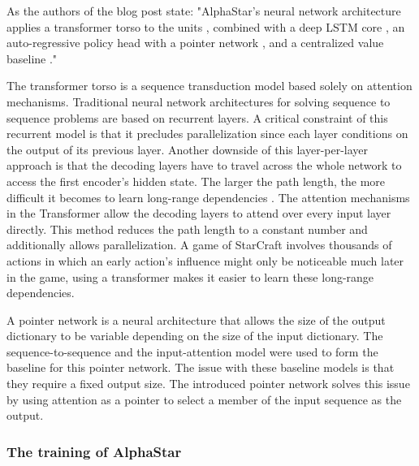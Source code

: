 As the authors of the blog post state: "AlphaStar's neural network architecture applies a transformer torso to the units \citep{vaswani2017attention}, combined with a deep LSTM core \citep{hochreiter1997long}, an auto-regressive policy head \citep{vinyals2017starcraft} with a pointer network \citep{vinyals2015pointer}, and a centralized value baseline \citep{alphastarblog}."

The transformer torso \citep{vaswani2017attention} is a sequence transduction model based solely on attention mechanisms. Traditional neural network architectures for solving sequence to sequence problems are based on recurrent layers. A critical constraint of this recurrent model is that it precludes parallelization since each layer conditions on the output of its previous layer. Another downside of this layer-per-layer approach is that the decoding layers have to travel across the whole network to access the first encoder's hidden state. The larger the path length, the more difficult it becomes to learn long-range dependencies \citep{hochreiter2001gradient}. The attention mechanisms in the Transformer allow the decoding layers to attend over every input layer directly. This method reduces the path length to a constant number and additionally allows parallelization. A game of StarCraft involves thousands of actions in which an early action's influence might only be noticeable  much later in the game, using a transformer makes it easier to learn these long-range dependencies. 

A pointer network \citep{vinyals2015pointer} is a neural architecture that allows the size of the output dictionary to be variable depending on the size of the input dictionary. The sequence-to-sequence \citep{sutskever2014sequence} and the input-attention model \citep{bahdanau2014neural} were used to form the baseline for this pointer network. The issue with these baseline models is that they require a fixed output size. The introduced pointer network solves this issue by using attention as a pointer to select a member of the input sequence as the output.

\subsubsection{The training of AlphaStar}~\\

